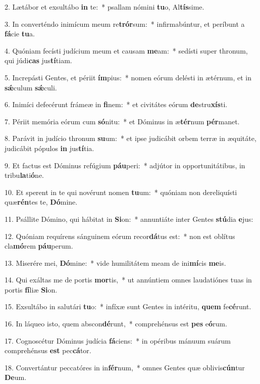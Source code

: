 2. Lætábor et exsultábo \textbf{in} te:~*  psallam nómini \textbf{tu}o, Al\textbf{tís}sime.\

3. In converténdo inimícum meum re\textbf{trór}sum:~*  infirmabúntur, et períbunt a \textbf{fá}cie \textbf{tu}a.\

4. Quóniam fecísti judícium meum et causam \textbf{me}am:~*  sedísti super thronum, qui júdi\textbf{cas} jus\textbf{tí}tiam.\

5. Increpásti Gentes, et périit \textbf{ím}pius:~*  nomen eórum delésti in ætérnum, et in \textbf{sǽ}culum \textbf{sǽ}culi.\

6. Inimíci defecérunt frámeæ in \textbf{fi}nem:~*  et civitátes eórum \textbf{de}stru\textbf{xís}ti.\

7. Périit memória eórum cum \textbf{só}nitu:~*  et Dóminus in æ\textbf{tér}num \textbf{pér}manet.\

8. Parávit in judício thronum \textbf{su}um:~*  et ipse judicábit orbem terræ in æquitáte, judicábit pópulos \textbf{in} jus\textbf{tí}tia.\

9. Et factus est Dóminus refúgium \textbf{páu}peri:~*  adjútor in opportunitátibus, in tribu\textbf{la}ti\textbf{ó}ne.\

10. Et sperent in te qui novérunt nomen \textbf{tu}um:~*  quóniam non dereliquísti quæ\textbf{rén}tes te, \textbf{Dó}mine.\

11. Psállite Dómino, qui hábitat in \textbf{Si}on:~*  annuntiáte inter Gentes \textbf{stú}dia \textbf{e}jus:\

12. Quóniam requírens sánguinem eórum recor\textbf{dá}tus est:~*  non est oblítus cla\textbf{mó}rem \textbf{páu}perum.\

13. Miserére mei, \textbf{Dó}mine:~*  vide humilitátem meam de ini\textbf{mí}cis \textbf{me}is.\

14. Qui exáltas me de portis \textbf{mor}tis,~*  ut annúntiem omnes laudatiónes tuas in portis \textbf{fí}liæ \textbf{Si}on.\

15. Exsultábo in salutári \textbf{tu}o:~*  infíxæ sunt Gentes in intéritu, \textbf{quem} fe\textbf{cé}runt.\

16. In láqueo isto, quem abscon\textbf{dé}runt,~*  comprehénsus est \textbf{pes} e\textbf{ó}rum.\

17. Cognoscétur Dóminus judícia \textbf{fá}ciens:~*  in opéribus mánuum suárum comprehénsus \textbf{est} pec\textbf{cá}tor.\

18. Convertántur peccatóres in in\textbf{fér}num,~*  omnes Gentes quæ oblivis\textbf{cún}tur \textbf{De}um.\

